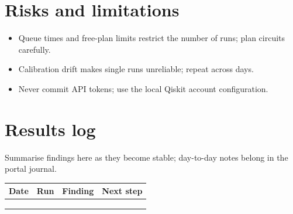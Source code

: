 \documentclass[11pt,a4paper]{article}
\begin{document}
\section{Risks and limitations}
\begin{itemize}
  \item Queue times and free-plan limits restrict the number of runs; plan circuits carefully.
  \item Calibration drift makes single runs unreliable; repeat across days.
  \item Never commit API tokens; use the local Qiskit account configuration.
\end{itemize}

\section{Results log}
\label{sec:log}
Summarise findings here as they become stable; day-to-day notes belong in the portal journal.

\begin{table}[h]
\centering\small
\begin{tabularx}{\linewidth}{@{}l l >{\raggedright}X >{\raggedright\arraybackslash}X@{}}
\toprule
Date & Run & Finding & Next step \\
\midrule
 & & & \\
 & & & \\
 & & & \\
\bottomrule
\end{tabularx}
\end{table}



\end{document}
